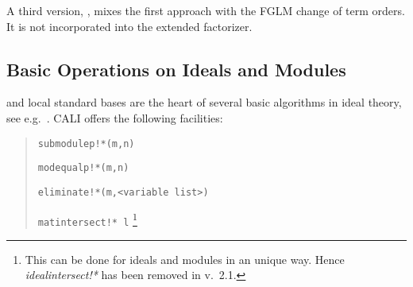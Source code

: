 A third version, , mixes the first approach with the
FGLM change of term orders. It is not incorporated into the extended
\gr factorizer.

\subsection{Basic Operations on Ideals and Modules}

\gr and local standard bases are the heart of several basic
algorithms in ideal theory, see e.g.\ \cite[6.2.]{BKW}. CALI offers
the following facilities:
\begin{quote}
\verb|submodulep!*(m,n)|


\verb|modequalp!*(m,n)|


\verb|eliminate!*(m,<variable list>)| 


\verb|matintersect!* l|
\footnote{This can be done for ideals and
modules in an unique way. Hence {\em idealintersect!*} has been
removed in v.\ 2.1.}

\end{quote}

